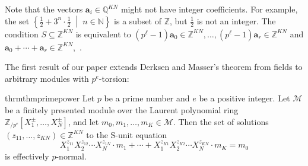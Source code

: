 \documentclass[letterpaper, 11pt, thm-restate]{article}
\numberwithin{equation}{section}
\newcommand{\Z}{\mathbb{Z}}
\newcommand{\N}{\mathbb{N}}
\newcommand{\Q}{\mathbb{Q}}
\newcommand{\Zpe}{\mathbb{Z}_{/p^e}}
\newcommand{\mM}{\mathcal{M}}
\newcommand{\ba}{\boldsymbol{a}}
\newcommand{\bh}{\boldsymbol{h}}
\newcommand{\red}{\textcolor{red}}
\theoremstyle{definition}
\theoremstyle{definition}
\theoremstyle{definition}
\newtheorem{rmk}[thrm]{Remark}
\begin{document}
Note that the vectors $\ba_i \in \Q^{KN}$ might not have integer coefficients. For example, the set $\left\{\frac{1}{2} + 3^n \cdot \frac{1}{2}\;\middle|\; n \in \N\right\}$ is a subset of $\Z$, but $\frac{1}{2}$ is not an integer. 
The condition $S \subseteq \Z^{KN}$ is equivalent to $(p^{\ell} - 1)\ba_0 \in \Z^{KN}, \ldots, (p^{\ell} - 1)\ba_r \in \Z^{KN}$ and $\ba_0 + \cdots + \ba_r \in \Z^{KN}$,~\cite[p.117]{derksen2015linear}.




The first result of our paper extends Derksen and Masser's theorem from fields to arbitrary modules with $p^e$-torsion:

\begin{restatable}{thrm}{thmprimepower}\label{thm:primepower}
    Let $p$ be a prime number and $e$ be a positive integer.
    Let $\mM$ be a finitely presented module over the Laurent polynomial ring $\Zpe[X_1^{\pm}, \ldots, X_N^{\pm}]$, and let $m_0, m_1, \ldots, m_K \in \mM$.
    Then the set of solutions $(z_{11}, \ldots, z_{KN}) \in \Z^{KN}$ to the S-unit equation
    \begin{equation}\label{eq:Sunitthm}
        X_1^{z_{11}} X_2^{z_{12}} \cdots X_N^{z_{1N}} \cdot m_1 + \cdots + X_1^{z_{K1}} X_2^{z_{K2}} \cdots X_N^{z_{KN}} \cdot m_K = m_0
    \end{equation}
    is effectively $p$-normal.
\end{restatable}
\end{document}
